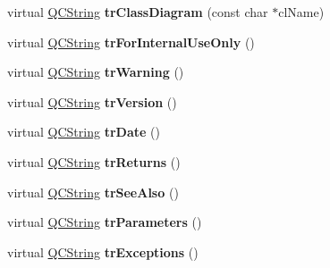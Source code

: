 \begin{DoxyCompactItemize}
\item 
\mbox{\label{class_translator_chinese_a409a12f63e155bc1932f7811c4631aa3}} 
virtual \mbox{\hyperlink{class_q_c_string}{Q\+C\+String}} {\bfseries tr\+Class\+Diagram} (const char $\ast$cl\+Name)
\item 
\mbox{\label{class_translator_chinese_afec7effa7129f254dbd06a3012f72d7c}} 
virtual \mbox{\hyperlink{class_q_c_string}{Q\+C\+String}} {\bfseries tr\+For\+Internal\+Use\+Only} ()
\item 
\mbox{\label{class_translator_chinese_a2dac895831b7daf21ef915aebeb79df7}} 
virtual \mbox{\hyperlink{class_q_c_string}{Q\+C\+String}} {\bfseries tr\+Warning} ()
\item 
\mbox{\label{class_translator_chinese_a42f90a67384ca5199dde2a5773d364fd}} 
virtual \mbox{\hyperlink{class_q_c_string}{Q\+C\+String}} {\bfseries tr\+Version} ()
\item 
\mbox{\label{class_translator_chinese_a13175654fbbe4a3e53e3ed83f1b1c32d}} 
virtual \mbox{\hyperlink{class_q_c_string}{Q\+C\+String}} {\bfseries tr\+Date} ()
\item 
\mbox{\label{class_translator_chinese_a600c6fbda5bc352f9fbc87866915d490}} 
virtual \mbox{\hyperlink{class_q_c_string}{Q\+C\+String}} {\bfseries tr\+Returns} ()
\item 
\mbox{\label{class_translator_chinese_a6cdf9a11a391e93da5b2bc5d03fd2793}} 
virtual \mbox{\hyperlink{class_q_c_string}{Q\+C\+String}} {\bfseries tr\+See\+Also} ()
\item 
\mbox{\label{class_translator_chinese_a9de9408d02b7b423db1ffcddd50aeadb}} 
virtual \mbox{\hyperlink{class_q_c_string}{Q\+C\+String}} {\bfseries tr\+Parameters} ()
\item 
\mbox{\label{class_translator_chinese_a4c707906563e4466bf6a3609c3ee8885}} 
virtual \mbox{\hyperlink{class_q_c_string}{Q\+C\+String}} {\bfseries tr\+Exceptions} ()
\item 

\end{DoxyCompactItemize}
